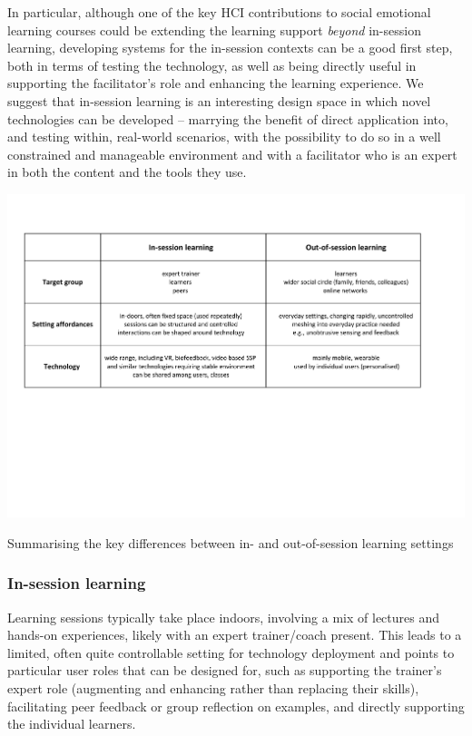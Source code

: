 \documentclass[prodmode,acmtochi]{acmsmall}
\begin{document}
In particular, although one of the key HCI contributions to social emotional learning courses could be extending the learning support \emph{beyond} in-session learning, developing systems for the in-session contexts can be a good first step, both in terms of testing the technology, as well as being directly useful in supporting the facilitator's role and enhancing the learning experience. We suggest that in-session learning is an interesting design space in which novel technologies can be developed -- marrying the benefit of direct application into, and testing within, real-world scenarios, with the possibility to do so in a well constrained and manageable environment and with a facilitator who is an expert in both the content and the tools they use.   




\begin{table}
  \centering
        \includegraphics[width=\textwidth]{images/in-out.pdf}
        \caption{Summarising the key differences between in- and out-of-session learning settings}
        \label{fig:in-out-dim}
\end{table}


\subsubsection{In-session learning}
Learning sessions typically take place indoors, involving a mix of lectures and hands-on experiences, likely with an expert trainer/coach present. This leads to a limited, often quite controllable setting for technology deployment and points to particular user roles that can be designed for, such as supporting the trainer's expert role (augmenting and enhancing rather than replacing their skills), facilitating peer feedback or group reflection on examples, and directly supporting the individual learners.
\end{document}

